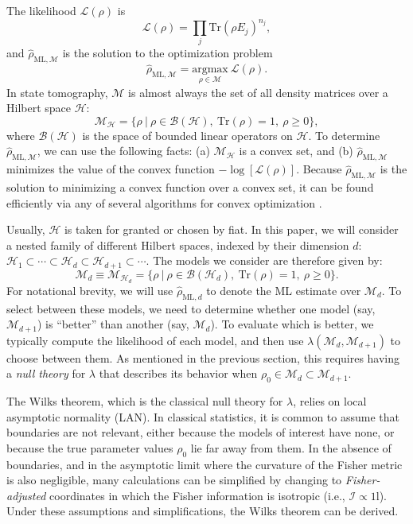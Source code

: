 \documentclass[aps,pra, twocolumn]{revtex4-1}
\newcommand{\M}{\mathcal{M}}
\newcommand{\cH}{\mathcal{H}}
\newcommand{\Id}{\mathbb{I}}
\def\Id{1\!\mathrm{l}}
\newcommand{\rhohat}{\hat{\rho}}
\newcommand{\rhoML}[1]{\rhohat_{\scriptscriptstyle{\mathrm{ML},#1}}}
\begin{document}
The likelihood $\mathcal{L}(\rho)$ is
\begin{equation}
\nonumber \mathcal{L}(\rho) = \prod_{j}\mathrm{Tr}(\rho E_{j})^{n_{j}},
\end{equation}
and $\rhoML{\M}$ is the solution to the optimization problem
\begin{equation}
\nonumber \rhoML{\M} = \underset{\rho \in \M}{\text{argmax}}~\mathcal{L}(\rho).
\end{equation}
In state tomography, $\M$ is almost always the set of all density matrices over a Hilbert space $\cH$:
\begin{equation}
\nonumber \mathcal{M}_{\cH} = \{\rho~|~\rho \in \mathcal{B}(\mathcal{H}),~\mathrm{Tr}(\rho) =1,~\rho \geq 0\},
\end{equation}
where $\mathcal{B}(\cH)$ is the space of bounded linear operators on $\cH$.  To determine $\rhoML{\M}$, we can use the following facts: (a) $\M_{\cH}$ is a convex set, and (b) $\rhoML{\M}$ minimizes the value of the convex function $-\log[\mathcal{L}(\rho)]$. Because $\rhoML{\M}$ is the solution to minimizing a convex function  over a convex set, it can be found efficiently via any of several algorithms for convex optimization \cite{Boyd}.

Usually, $\cH$ is taken for granted or chosen by fiat.  In this paper, we will consider a nested family of different Hilbert spaces, indexed by their dimension $d$: $\cH_{1}  \subset \cdots \subset \cH_{d} \subset \cH_{d+1} \subset \cdots$.  The models we consider are therefore given by:
\begin{equation}
\label{eq:modelsd}
\M_{d} \equiv \mathcal{M}_{\cH_{d}} = \{\rho~|~\rho \in \mathcal{B}(\mathcal{H}_{d}),~\mathrm{Tr}(\rho) =1,~\rho \geq 0\}.
\end{equation}
For notational brevity, we will use $\rhoML{d}$ to denote the ML estimate over $\M_{d}$. To select between these models, we need to determine whether one model (say, $\M_{d + 1}$) is ``better'' than another (say, $\M_{d}$).  To evaluate which is better, we typically compute the likelihood of each model, and then use $\lambda(\M_{d}, \M_{d+1})$ to choose between them. As mentioned in the previous section, this requires having a \emph{null theory} for $\lambda$ that describes its behavior when $\rho_{0} \in \M_{d} \subset \M_{d + 1}$.

The Wilks theorem, which is the classical null theory for $\lambda$, relies on local asymptotic normality (LAN). In classical statistics, it is common to assume that boundaries are not relevant, either because the models of interest have none, or because the true parameter values $\rho_{0}$ lie far away from them.  In the absence of boundaries, and in the asymptotic limit where the curvature of the Fisher metric is also negligible, many calculations can be simplified by changing to \emph{Fisher-adjusted} coordinates in which the Fisher information is isotropic (i.e., $\mathcal{I}\propto\Id$). Under these assumptions and simplifications, the Wilks theorem can be derived.
\end{document}
